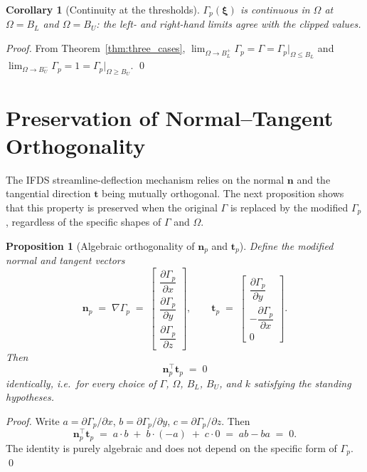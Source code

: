 \documentclass[11pt]{article}
\newtheorem{proposition}[theorem]{Proposition}
\newtheorem{corollary}[theorem]{Corollary}
\theoremstyle{remark}
\newcommand{\G}{\Gamma}
\newcommand{\Gp}{\Gamma_p}
\newcommand{\Om}{\Omega}
\newcommand{\xib}{\bm{\xi}}
\newcommand{\nb}{\mathbf{n}}
\newcommand{\tb}{\mathbf{t}}
\begin{document}
\begin{corollary}[Continuity at the thresholds]
\label{cor:continuity}
$\Gp(\xib)$ is continuous in $\Om$ at $\Om=B_L$ and $\Om=B_U$: the left- and right-hand limits agree with the clipped values.
\end{corollary}

\begin{proof}
From Theorem~\ref{thm:three_cases},
$\lim_{\Om\to B_L^{+}}\Gp = \G = \Gp|_{\Om\le B_L}$ and
$\lim_{\Om\to B_U^{-}}\Gp = 1 = \Gp|_{\Om\ge B_U}$. \qed
\end{proof}

\bigskip

\section{Preservation of Normal--Tangent Orthogonality}

The IFDS streamline-deflection mechanism relies on the normal $\nb$ and the tangential direction $\tb$ being mutually orthogonal. The next proposition shows that this property is preserved when the original $\G$ is replaced by the modified $\Gp$, regardless of the specific shapes of $\G$ and $\Om$.

\begin{proposition}[Algebraic orthogonality of $\nb_p$ and $\tb_p$]
\label{prop:orthogonality}
Define the modified normal and tangent vectors
\[
    \nb_p \;=\; \nabla\Gp \;=\;
    \begin{bmatrix}
        \dfrac{\partial\Gp}{\partial x}\\[4pt]
        \dfrac{\partial\Gp}{\partial y}\\[4pt]
        \dfrac{\partial\Gp}{\partial z}
    \end{bmatrix},
    \qquad
    \tb_p \;=\;
    \begin{bmatrix}
        \dfrac{\partial\Gp}{\partial y}\\[4pt]
        -\dfrac{\partial\Gp}{\partial x}\\[4pt]
        0
    \end{bmatrix}.
\]
Then
\[
    \nb_p^{\top}\tb_p \;=\; 0
\]
identically, i.e.\ for \emph{every} choice of $\G$, $\Om$, $B_L$, $B_U$, and $k$ satisfying the standing hypotheses.
\end{proposition}

\begin{proof}
Write $a=\partial\Gp/\partial x$, $b=\partial\Gp/\partial y$, $c=\partial\Gp/\partial z$. Then
\[
    \nb_p^{\top}\tb_p
    \;=\; a\cdot b \;+\; b\cdot(-a) \;+\; c\cdot 0
    \;=\; ab-ba
    \;=\; 0.
\]
The identity is purely algebraic and does not depend on the specific form of $\Gp$. \qed
\end{proof}
\end{document}
